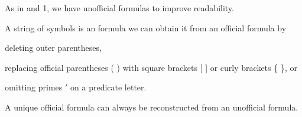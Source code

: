 As in \GSL{} and \GQL{}1, we have unofficial formulas to improve readability.
\begin{majorILnc}{}
A string of symbols is an  formula \Iff we can obtain it from an official formula by
\begin{cenumerate}
\item deleting outer parentheses,
\item replacing official parentheses ( ) with square brackets [ ] or curly brackets \{ \}, or
\item omitting primes $'$ on a predicate letter.
\end{cenumerate}
\end{majorILnc}

A unique official formula can always be reconstructed from an unofficial formula.

